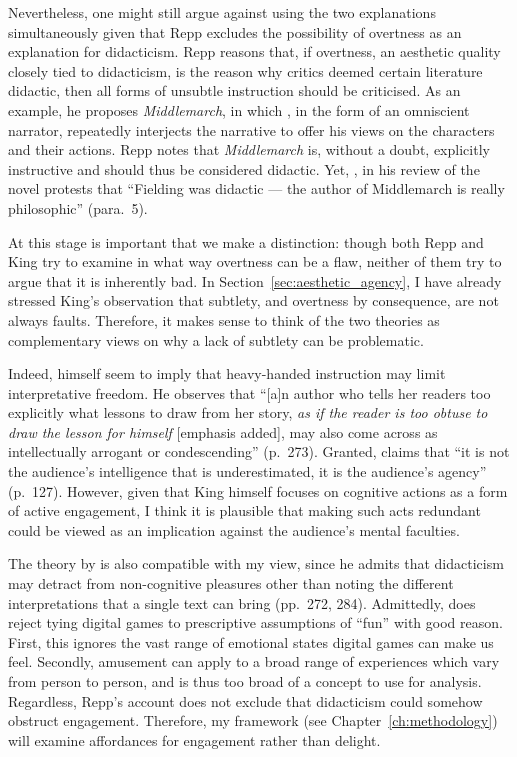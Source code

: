Nevertheless, one might still argue against using the two explanations simultaneously given that Repp excludes the possibility of overtness as an explanation for didacticism. Repp reasons that, if overtness, an aesthetic quality closely tied to didacticism, is the reason why critics deemed certain literature didactic, then all forms of unsubtle instruction should be criticised. As an example, he proposes \textit{Middlemarch}, in which \textcite{eliot_middlemarch_2008}, in the form of an omniscient narrator, repeatedly interjects the narrative to offer his views on the characters and their actions. Repp notes that \textit{Middlemarch} is, without a doubt, explicitly instructive and should thus be considered didactic. Yet, \textcite{james_review_2002}, in his review of the novel protests that ``Fielding was didactic --- the author of Middlemarch is really philosophic'' (para.~5).

At this stage is important that we make a distinction: though both Repp and King try to examine in what way overtness can be a flaw, neither of them try to argue that it is inherently bad. In Section~\ref{sec:aesthetic_agency}, I have already stressed King's observation that subtlety, and overtness by consequence, are not always faults. Therefore, it makes sense to think of the two theories as complementary views on why a lack of subtlety can be problematic.

Indeed, \textcite{repp_whats_2012} himself seem to imply that heavy-handed instruction may limit interpretative freedom. He observes that ``[a]n author who tells her readers too explicitly what lessons to draw from her story, \textit{as if the reader is too obtuse to draw the lesson for himself} [emphasis added], may also come across as intellectually arrogant or condescending'' (p.~273). Granted, \textcite{king_virtue_2017} claims that ``it is not the audience's intelligence that is underestimated, it is the audience's agency'' (p.~127). However, given that King himself focuses on cognitive actions as a form of active engagement, I think it is plausible that making such acts redundant could be viewed as an implication against the audience's mental faculties.

The theory by \textcite{repp_whats_2012} is also compatible with my view, since he admits that didacticism may detract from non-cognitive pleasures other than noting the different interpretations that a single text can bring (pp.~272, 284). Admittedly, \textcite[51--53]{calleja_in_game_2011} does reject tying digital games to prescriptive assumptions of ``fun'' with good reason. First, this ignores the vast range of emotional states digital games can make us feel. Secondly, amusement can apply to a broad range of experiences which vary from person to person, and is thus too broad of a concept to use for analysis. Regardless, Repp's account does not exclude that didacticism could somehow obstruct engagement. Therefore, my framework (see Chapter~\ref{ch:methodology}) will examine affordances for engagement rather than delight.

